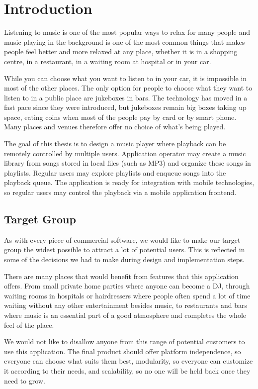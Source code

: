\chapter*{Introduction}

Listening to music is one of the most popular ways to relax for many people and music playing in the background is one of the most common things that makes people feel better and more relaxed at any place, whether it is in a shopping centre, in a restaurant, in a waiting room at hospital or in your car.
\par
While you can choose what you want to listen to in your car, it is impossible in most of the other places. The only option for people to choose what they want to listen to in a public place are jukeboxes in bars. The technology has moved in a fast pace since they were introduced, but jukeboxes remain big boxes taking up space, eating coins when most of the people pay by card or by smart phone. Many places and venues therefore offer no choice of what's being played.
\par
The goal of this thesis is to design a music player where playback can be remotely controlled by multiple users. Application operator may create a music library from songs stored in local files (such as MP3) and organize these songs in playlists. Regular users may explore playlists and enqueue songs into the playback queue. The application is ready for integration with mobile technologies, so regular users may control the playback via a mobile application frontend.

\section*{Target Group}

As with every piece of commercial software, we would like to make our target group the widest possible to attract a lot of potential users. This is reflected in some of the decisions we had to make during design and implementation steps.
\par
There are many places that would benefit from features that this application offers. From small private home parties where anyone can become a DJ, through waiting rooms in hospitals or hairdressers where people often spend a lot of time waiting without any other entertainment besides music, to restaurants and bars where music is an essential part of a good atmosphere and completes the whole feel of the place.
\par
We would not like to disallow anyone from this range of potential customers to use this application. The final product should offer platform independence, so everyone can choose what suits them best, modularity, so everyone can customize it according to their needs, and scalability, so no one will be held back once they need to grow.

